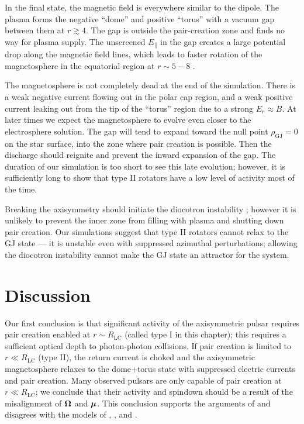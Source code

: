 In the final state, the magnetic field is everywhere similar to the dipole.
The plasma forms the negative ``dome'' and positive ``torus''
with a vacuum gap between them at $r\gtrsim 4$.
The gap is outside the pair-creation zone and finds no way for plasma supply.
The unscreened $E_\parallel$ in the gap creates a
large potential drop along the
magnetic field lines, which leads to faster rotation of the magnetosphere in the
equatorial region at $r\sim 5-8$
\citep[cf.][]{wada_particle_2011}.

The magnetosphere is not completely dead at the end of the simulation.
There is a weak negative current flowing out in the polar cap region, and
a weak positive current leaking out from the tip of the ``torus'' region
due to a strong $E_r\approx B$.
At later times we expect the magnetosphere to evolve even closer to
the electrosphere solution.  The gap will tend to expand toward the
null point $\rho_\mathrm{GJ}=0$
on the star surface, into the zone where pair creation is
possible. Then the discharge should reignite and prevent the inward
expansion of the gap. The duration of our simulation is too short to
see this late evolution; however, it is sufficiently long to show that type
II rotators have a low level of activity most of the time.

Breaking the axisymmetry should initiate the diocotron instability
\citep{philippov_ab_2014};  however it is unlikely to
prevent the inner zone from filling with plasma and
shutting down pair creation. Our simulations suggest that type II rotators
cannot relax to the GJ state
--- it is unstable even with suppressed azimuthal perturbations; allowing the
diocotron instability cannot make the GJ state an attractor for the system.



\section{Discussion}


Our first conclusion is that significant activity of the axisymmetric pulsar
requires pair creation enabled at $r\sim R_\mathrm{LC}$
(called type I in this chapter); this requires a sufficient optical
depth to photon-photon collisions.
If pair creation is limited to $r\ll R_\mathrm{LC}$ (type II),
the return current is choked and the axisymmetric magnetosphere relaxes to the
dome+torus state with suppressed electric currents and pair creation.
Many observed pulsars are only capable of pair creation at
$r\ll R_\mathrm{LC}$; we conclude that their activity and spindown should
be a result of the misalignment of $\bm{\Omega}$ and $\bm{\mu}$. This conclusion
supports the arguments of
\citet{michel_state_2004}
 and disagrees with the models of
\citet{goldreich_pulsar_1969},
\citet{ruderman_theory_1975},
and
\citet{gruzinov_aristotelian_2013}.

